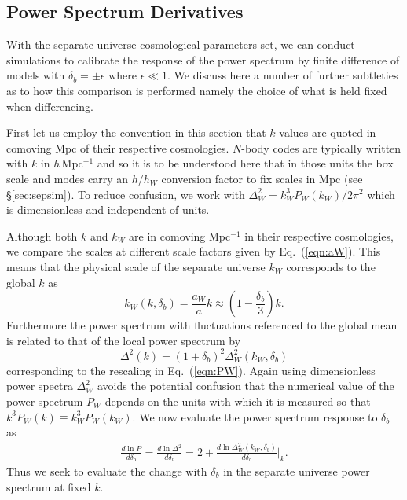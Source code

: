 \documentclass[prd,twocolumn,amsmath,amssymb,floatfix,superscriptaddress]{revtex4-1}
\newcommand{\wh}[1]{{#1}}
\begin{document}
\subsection{Power Spectrum Derivatives}
\label{sec:sepder}

With the separate universe cosmological parameters set, we can
conduct simulations to calibrate the response of the power spectrum by finite difference
of models with $\delta_b =\pm \epsilon$ where $\epsilon \ll  1$.   We discuss here
a number of further subtleties as to how this comparison is performed 
namely the choice of what is held fixed when differencing.

 First let us employ the convention in this
section that $k$-values are quoted in comoving Mpc of their respective cosmologies.   $N$-body codes are typically written with $k$ in $h\,$Mpc$^{-1}$ and so it is to be understood here that
in those units the box scale and modes carry an $h/h_W$ conversion factor to fix scales
in Mpc (see \S \ref{sec:sepsim}).  To reduce confusion, we work with
$\Delta_W^2 = k_W^3 P_W(k_W)/2\pi^2$ which is dimensionless and independent of units.

Although both $k$ and $k_W$ are in comoving Mpc$^{-1}$ in their respective cosmologies, we compare the scales at different scale factors given by Eq.~(\ref{eqn:aW}).   This means that the physical scale of the separate universe  $k_W$ corresponds to the global  $k$ as
\begin{equation}
k_W(k,\delta_b) = \frac{a_W}{a} k \approx \left( 1- \frac{\delta_b}{3} \right) k.
\label{eqn:kW}
\end{equation}
Furthermore the power spectrum with fluctuations referenced to the global mean is
related to that of the local power spectrum by
\begin{equation}
\Delta^2(k) = (1+\delta_b)^2 \Delta_W^2(k_W,\delta_b)
\end{equation}
corresponding to the rescaling in Eq.~(\ref{eqn:PW}).  \wh{Again using dimensionless power spectra $\Delta_W^2$ avoids the potential confusion that the numerical value of the power 
spectrum $P_W$ depends on the units with which it is measured so that
$k^3 P_W(k) \equiv k_W^3 P_W(k_W)$.}
We now evaluate the power spectrum response to $\delta_b$ as
\begin{eqnarray}
\frac{d\ln P}{d\delta_b} = \frac{d \ln \Delta^2}{d\delta_b} 
= 2 + \frac {d \ln \Delta_W^2(k_W,\delta_b)}{d\delta_b}\Big|_k.
\label{eqn:totalderiv}
\end{eqnarray}
Thus we seek to evaluate the change with $\delta_b$
 in the separate universe power spectrum at fixed $k$.
\end{document}
